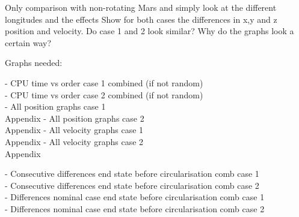 Only comparison with non-rotating Mars and simply look at the different longitudes and the effects
Show for both cases the differences in x,y and z position and velocity. Do case 1 and 2 look similar? Why do the graphs look a certain way?

Graphs needed:

- CPU time vs order case 1 combined (if not random) \\
- CPU time vs order case 2 combined (if not random) \\
- All position graphs case 1 \\ Appendix
- All position graphs case 2 \\ Appendix
- All velocity graphs case 1 \\ Appendix
- All velocity graphs case 2 \\ Appendix

- Consecutive differences end state before circularisation comb case 1 \\
- Consecutive differences end state before circularisation comb case 2 \\
- Differences nominal case end state before circularisation comb case 1 \\
- Differences nominal case end state before circularisation comb case 2 \\




